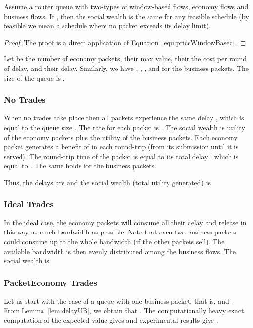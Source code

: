 \documentclass[letterpaper,10pt]{llncs}
\begin{document}
\begin{lemma}
\label{lem:SocialWealthEqualVmax}
Assume a router queue with two-types of window-based flows, economy flows and business flows. 
If , then the social wealth is the same for any feasible schedule (by feasible we mean 
a schedule where no packet exceeds its delay limit).
\end{lemma}

\begin{proof}
The proof is a direct application of Equation~\ref{equ:priceWindowBased}.
\end{proof}

Let  be the number of economy packets,  their max value,  their the cost per round of delay, and  their delay. Similarly, we have , , , and  for the business packets.
The size of the queue is . 

\subsubsection{No Trades}
When no trades take place then all packets experience the same delay , which is equal to the
queue size . The rate for each packet is .
The social wealth is utility of the economy packets plus the utility of the business packets.
Each economy packet generates a benefit of  in each round-trip (from its submission until it is served). The round-trip time of the packet is equal to its total delay , which is equal to . The same holds for the business packets. 

Thus, the delays are  and the social wealth (total utility generated) is 


\subsubsection{Ideal Trades}
In the ideal case, the economy packets will consume all their delay and release in this way 
as much bandwidth as possible. Note that even two business packets could consume up to the
whole bandwidth (if the other packets sell).
The available bandwidth is then evenly distributed among the 
business flows.
The social wealth is 


\subsubsection{PacketEconomy Trades}
\label{sec:PETrades}
Let us start with the case of a queue with one business packet, that is,  and .
From Lemma~\ref{lem:delayUB}, we obtain that .
The computationally heavy exact computation of the expected value gives  and experimental results give .
\end{document}
